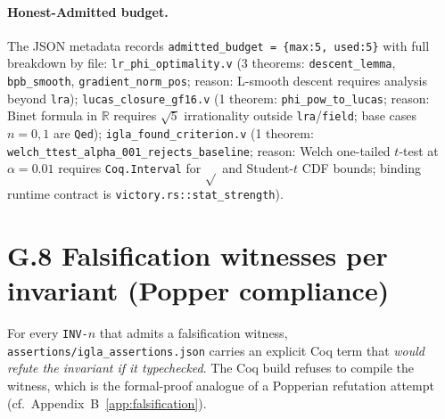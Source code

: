 \paragraph{Honest-Admitted budget.} The JSON metadata records
\texttt{admitted\_budget = \{max:5, used:5\}} with full breakdown by file:
\texttt{lr\_phi\_optimality.v} (3 theorems: \texttt{descent\_lemma},
\texttt{bpb\_smooth}, \texttt{gradient\_norm\_pos}; reason: L-smooth descent
requires analysis beyond \texttt{lra}); \texttt{lucas\_closure\_gf16.v}
(1 theorem: \texttt{phi\_pow\_to\_lucas}; reason: Binet formula in $\mathbb{R}$ requires
$\sqrt{5}$ irrationality outside \texttt{lra}/\texttt{field}; base cases $n=0,1$ are
\texttt{Qed}); \texttt{igla\_found\_criterion.v} (1 theorem:
\texttt{welch\_ttest\_alpha\_001\_rejects\_baseline}; reason: Welch one-tailed
$t$-test at $\alpha=0.01$ requires \texttt{Coq.Interval} for $\sqrt{}$ and Student-$t$
CDF bounds; binding runtime contract is \texttt{victory.rs::stat\_strength}).

\section*{G.8 Falsification witnesses per invariant (Popper compliance)}

\noindent For every \texttt{INV-$n$} that admits a falsification witness,
\texttt{assertions/igla\_assertions.json} carries an explicit Coq term that
\emph{would refute the invariant if it typechecked}. The Coq build refuses
to compile the witness, which is the formal-proof analogue of a Popperian
refutation attempt (cf.~Appendix~B~\ref{app:falsification}).

